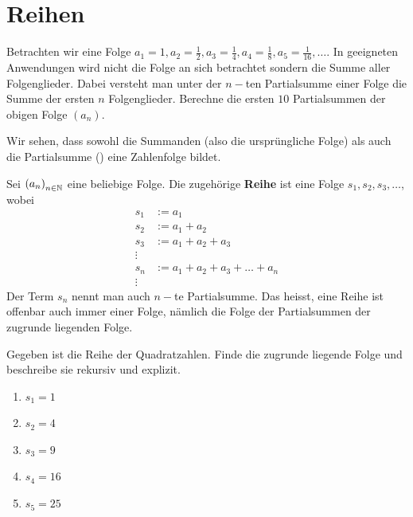\documentclass[11pt,oneside]{article}
\begin{document}
\section{Reihen}
	\begin{aufgabe}
		Betrachten wir eine Folge $a_1=1, a_2=\frac{1}{2}, a_3=\frac{1}{4}, a_4=\frac{1}{8}, a_5=\frac{1}{16}, \ldots$. In geeigneten Anwendungen wird nicht die Folge an sich betrachtet sondern die Summe aller Folgenglieder. Dabei versteht man unter der $n-$ten Partialsumme einer Folge die Summe der ersten $n$ Folgenglieder. Berechne die ersten $10$ Partialsummen der obigen Folge $(a_n)$.\\[5pt]
	\end{aufgabe}
	Wir sehen, dass sowohl die Summanden (also die ursprüngliche Folge) als auch die Partialsumme () eine Zahlenfolge bildet.
	\begin{definition}[Reihe]
		Sei $\left(a_n\right)_{n\in\mathbb{N}}$ eine beliebige Folge. Die zugehörige \textbf{Reihe} ist eine Folge $s_1,s_2,s_3,\ldots$, wobei
		\begin{align*}
			s_1&:=a_1\\
			s_2&:=a_1+a_2\\
			s_3&:=a_1+a_2+a_3\\
			\vdots&\\
			s_n&:=a_1+a_2+a_3+\ldots+a_n\\
			\vdots&
		\end{align*}
		Der Term $s_n$ nennt man auch $n-$te Partialsumme. Das heisst, eine Reihe ist offenbar auch immer einer Folge, nämlich die Folge der Partialsummen der zugrunde liegenden Folge.
	\end{definition}
	\begin{beispiel}
		Gegeben ist die Reihe der Quadratzahlen. Finde die zugrunde liegende Folge und beschreibe sie rekursiv und explizit.
		\begin{enumerate}[label=\ ]
			\item $s_1=1$
			\item $s_2=4$
			\item $s_3=9$
			\item $s_4=16$
			\item $s_5=25$
		\end{enumerate}
	\end{beispiel}
\end{document}
